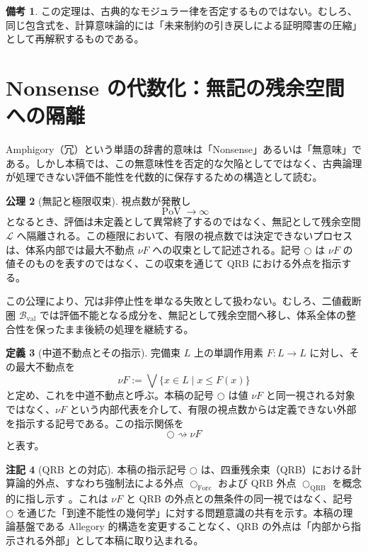 \documentclass[a4paper,11pt]{article}
\newcommand{\PoV}{\operatorname{PoV}}
\newcommand{\dfix}{\bigcirc}
\newcommand{\Forc}{\mathrm{Forc}}
\newcommand{\QRB}{\mathrm{QRB}}
\theoremstyle{definition}
\newtheorem{definition}{定義}[section]
\newtheorem{axiom}[definition]{公理}
\newtheorem{remark}[definition]{備考}
\newtheorem{note}[definition]{注記}
\begin{document}
\begin{remark}
この定理は、古典的なモジュラー律を否定するものではない。むしろ、同じ包含式を、計算意味論的には「未来制約の引き戻しによる証明障害の圧縮」として再解釈するものである。
\end{remark}

\section{Nonsense の代数化：無記の残余空間への隔離}
Amphigory（冗）という単語の辞書的意味は「Nonsense」あるいは「無意味」である。しかし本稿では、この無意味性を否定的な欠陥としてではなく、古典論理が処理できない評価不能性を代数的に保存するための構造として読む。

\begin{axiom}[無記と極限収束]
視点数が発散し
\[
\PoV \to \infty
\]
となるとき、評価は未定義として異常終了するのではなく、無記として残余空間 $\mathcal{L}$ へ隔離される。この極限において、有限の視点数では決定できないプロセスは、体系内部では最大不動点 $\nu F$ への収束として記述される。記号 $\dfix$ は $\nu F$ の値そのものを表すのではなく、この収束を通じて QRB における外点を指示する。
\end{axiom}

この公理により、冗は非停止性を単なる失敗として扱わない。むしろ、二値截断圏 $\mathcal{B}_{\mathrm{val}}$ では評価不能となる成分を、無記として残余空間へ移し、体系全体の整合性を保ったまま後続の処理を継続する。

\begin{definition}[中道不動点とその指示]
完備束 $L$ 上の単調作用素 $F\colon L\to L$ に対し、その最大不動点を
\[
\nu F := \bigvee \{x\in L \mid x \le F(x)\}
\]
と定め、これを中道不動点と呼ぶ。本稿の記号 $\dfix$ は値 $\nu F$ と同一視される対象ではなく、$\nu F$ という内部代表を介して、有限の視点数からは定義できない外部を指示する記号である。この指示関係を
\[
\dfix \rightsquigarrow \nu F
\]
と表す。
\end{definition}

\begin{note}[QRB との対応]
本稿の指示記号 $\dfix$ は、四重残余束（QRB）における計算論的外点、すなわち強制法による外点 $\dfix_{\Forc}$ および QRB 外点 $\dfix_{\QRB}$ を概念的に指し示す \cite{ChibaQRB2026}。これは $\nu F$ と QRB の外点との無条件の同一視ではなく、記号 $\dfix$ を通じた「到達不能性の幾何学」に対する問題意識の共有を示す。本稿の理論基盤である Allegory 的構造を変更することなく、QRB の外点は「内部から指示される外部」として本稿に取り込まれる。
\end{note}
\end{document}
